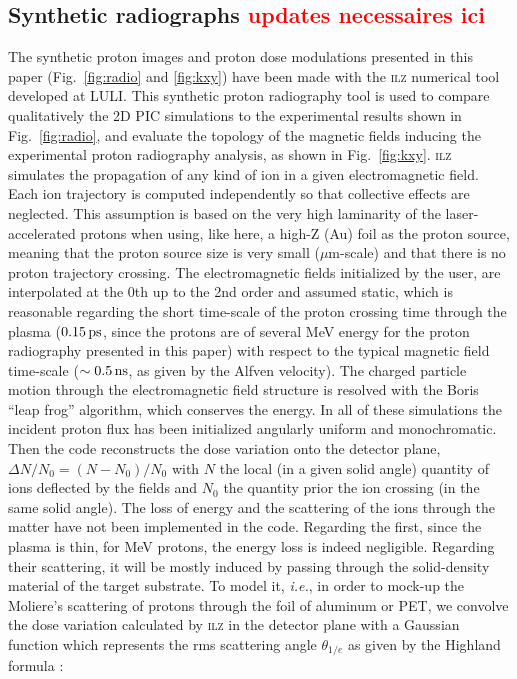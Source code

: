 \documentclass[aps,twocolumn,showpacs,superscriptaddress]{revtex4}
\begin{document}
\subsection*{Synthetic radiographs \textcolor{red}{updates necessaires ici}}
The synthetic proton images and proton dose modulations presented in this paper (Fig.~\ref{fig:radio} and  \ref{fig:kxy}) have been made with the \textsc{ilz} numerical tool developed at LULI. This synthetic proton radiography tool is used to compare qualitatively the 2D PIC simulations to the experimental results shown in Fig.~\ref{fig:radio}, and evaluate the topology of the magnetic fields inducing the experimental proton radiography analysis, as shown in Fig.~\ref{fig:kxy}.
\textsc{ilz} simulates the propagation of any kind of ion in a given electromagnetic field. Each ion trajectory is computed independently so that collective effects are neglected. This assumption is based on the very high laminarity of the laser-accelerated protons \cite{PRL_Cowan_2004, PRL_Fuchs_2003} when using, like here, a high-Z (Au) foil as the proton source, meaning that the proton source size is very small ($\mu$m-scale) and that there is no proton trajectory crossing. The electromagnetic  fields   initialized by the user, are interpolated at the 0th up to the 2nd order and assumed static, which is reasonable regarding the short time-scale of the proton crossing time through the plasma ($0.15\,\rm ps$, since the protons are of several MeV energy for the proton radiography presented in this paper) with respect to the typical magnetic field time-scale ($\sim 0.5\,\rm ns$, as given by the Alfven velocity). The charged particle motion through the electromagnetic  field structure is resolved with the Boris “leap frog” algorithm, which conserves the energy. In all of these simulations the incident proton flux has been initialized angularly uniform and monochromatic. Then the code reconstructs the dose variation onto the detector plane, $\Delta N/N_0= (N- N_0)/N_0$ with $N$ the local (in a given solid angle) quantity of ions deflected by the fields and $N_0$ the quantity prior the ion crossing  (in the same solid angle). 
The loss of energy and the scattering of the ions through the matter have not been implemented in the code. Regarding the first, since the plasma is thin, for MeV protons, the energy loss is indeed negligible. Regarding their scattering, it will be mostly induced by passing through the solid-density material of the target substrate. To model it, \emph{i.e.}, in order to mock-up the Moliere's scattering of protons through the foil of aluminum or PET, we convolve the dose variation calculated by \textsc{ilz} in the detector plane with a Gaussian function which represents the rms scattering angle $\theta_{1/e}$ as given by the Highland formula \cite{NIM_Highland_1975}:
\end{document}
